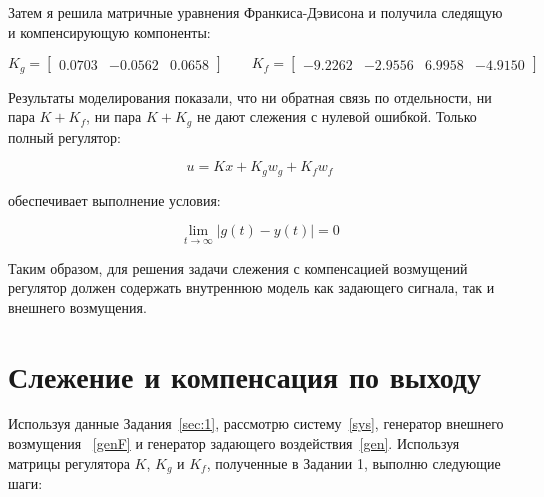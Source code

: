 \documentclass[a4paper,12pt]{article}
\begin{document}
	Затем я решила матричные уравнения Франкиса-Дэвисона и получила следящую и компенсирующую компоненты:
	
	\[
	K_g = \begin{bmatrix}
		0.0703 & -0.0562 & 0.0658
	\end{bmatrix} \qquad
	K_f = \begin{bmatrix}
		-9.2262 & -2.9556 & 6.9958 & -4.9150
	\end{bmatrix}
	\]
	
	Результаты моделирования показали, что ни обратная связь по отдельности, ни пара \(K + K_f\), ни пара \(K + K_g\) не дают слежения с нулевой ошибкой. Только полный регулятор:
	
	\[
	u = Kx + K_g w_g + K_f w_f
	\]
	
	обеспечивает выполнение условия:
	
	\[
	\lim_{t \to \infty} |g(t) - y(t)| = 0
	\]
	
	Таким образом, для решения задачи слежения с компенсацией возмущений регулятор должен содержать внутреннюю модель как задающего сигнала, так и внешнего возмущения.
	
	
	\newpage \section{Слежение и компенсация по выходу}


Используя данные Задания~\ref{sec:1}, рассмотрю систему~\ref{sys}, генератор внешнего возмущения ~\ref{genF} и генератор задающего воздействия~\ref{gen}. Используя матрицы регулятора \(K\), \(K_g\) и \(K_f\), полученные в Задании 1, выполню следующие шаги:
\end{document}
